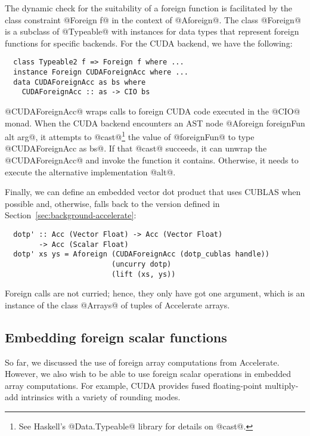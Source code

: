 The dynamic check for the suitability of a foreign function is facilitated by the class constraint @Foreign f@ in the context of @Aforeign@. The class @Foreign@ is a subclass of @Typeable@ with instances for data types that represent foreign functions for specific backends. For the CUDA backend, we have the following:
%
{\small
\begin{lstlisting}
  class Typeable2 f => Foreign f where ...
  instance Foreign CUDAForeignAcc where ...
  data CUDAForeignAcc as bs where
    CUDAForeignAcc :: as -> CIO bs
\end{lstlisting}%
}\noindent
@CUDAForeignAcc@ wraps calls to foreign CUDA code executed in the @CIO@ monad. When the CUDA backend encounters an AST node  @Aforeign foreignFun alt arg@, it attempts to @cast@\footnote{See Haskell's @Data.Typeable@ library for details on @cast@.} the value of @foreignFun@ to type @CUDAForeignAcc as bs@. If that @cast@ succeeds, it can unwrap the @CUDAForeignAcc@ and invoke the function it contains. Otherwise, it needs to execute the alternative implementation @alt@.

Finally, we can define an embedded vector dot product that uses CUBLAS when possible and, otherwise, falls back to the version defined in Section~\ref{sec:background-accelerate}:
%
{\small
\begin{lstlisting}
  dotp' :: Acc (Vector Float) -> Acc (Vector Float)
        -> Acc (Scalar Float)
  dotp' xs ys = Aforeign (CUDAForeignAcc (dotp_cublas handle))
                         (uncurry dotp)
                         (lift (xs, ys))
\end{lstlisting}
}\noindent%
%
Foreign calls are not curried; hence, they only have got one argument, which is an instance of the class @Arrays@ of tuples of Accelerate arrays.

\subsection{Embedding foreign scalar functions}

So far, we discussed the use of foreign array computations from Accelerate. However, we also wish to be able to use foreign scalar operations in embedded array computations. For example, CUDA provides fused floating-point multiply-add intrinsics with a variety of rounding modes.

